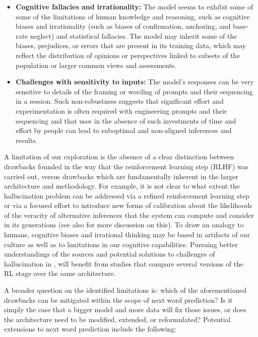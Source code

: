\begin{itemize}
    \item \textbf{Cognitive fallacies and irrationality:} The model seems to exhibit some of some of the limitations of human knowledge and reasoning, such as cognitive biases and irrationality (such as biases of confirmation, anchoring, and base-rate neglect) and statistical fallacies. The model may inherit some of the biases, prejudices, or errors that are present in its training data, which may reflect the distribution of opinions or perspectives linked to subsets of the population or  larger common views and assessments. 
     \item \textbf{Challenges with sensitivity to inputs:} The model's responses can be very sensitive to details of the framing or wording of prompts and their sequencing in a session. Such non-robustness suggests that significant effort and experimentation is often required with engineering prompts and their sequencing and that uses in the absence of such investments of time and effort by people can lead to suboptimal and non-aligned inferences and results. 
\end{itemize}

A limitation of our exploration is the absence of a clear distinction between drawbacks founded in the way that the reinforcement learning step (RLHF) was carried out, versus drawbacks which are fundamentally inherent in the larger architecture and methodology. For example, it is not clear to what extent the hallucination problem can be addressed via a refined reinforcement learning step or via a focused effort to introduce new forms of calibration about the likelihoods of the veracity of alternative inferences that the system can compute and consider in its generations (see also \cite{gpt4} for more discussion on this). To draw an analogy to humans, cognitive biases and irrational thinking may be based in artifacts of our culture as well as to limitations in our cognitive capabilities. Pursuing better understandings of the sources and potential solutions to challenges of hallucination in \DV, will benefit from studies that compare several versions of the RL stage over the same architecture.
\newline

A broader question on the identified limitations is: which of the aforementioned drawbacks can be mitigated within the scope of next word prediction? Is it simply the case that a bigger model and more data will fix those issues, or does the architecture need to be modified, extended, or reformulated? Potential extensions to next word prediction include the following:

